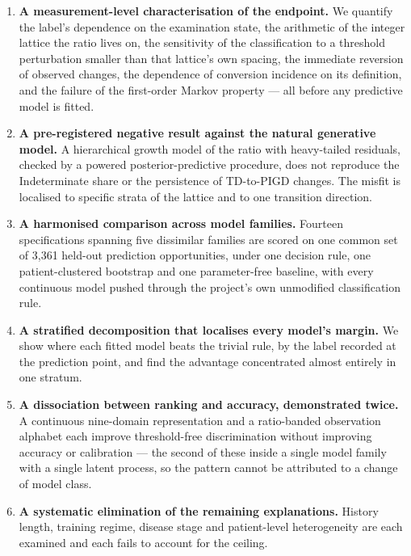 \documentclass[11pt]{article}
\begin{document}
\begin{enumerate}
\itemsep2pt
\item \textbf{A measurement-level characterisation of the endpoint.} We quantify
the label's dependence on the examination state, the arithmetic of the integer
lattice the ratio lives on, the sensitivity of the classification to a threshold
perturbation smaller than that lattice's own spacing, the immediate reversion of
observed changes, the dependence of conversion incidence on its definition, and
the failure of the first-order Markov property --- all before any predictive
model is fitted.

\item \textbf{A pre-registered negative result against the natural generative
model.} A hierarchical growth model of the ratio with heavy-tailed residuals,
checked by a powered posterior-predictive procedure, does not reproduce the
Indeterminate share or the persistence of TD-to-PIGD changes. The misfit is
localised to specific strata of the lattice and to one transition direction.

\item \textbf{A harmonised comparison across model families.} Fourteen
specifications spanning five dissimilar families are scored on one common set of
3,361 held-out prediction opportunities, under one decision rule, one
patient-clustered bootstrap and one parameter-free baseline, with every
continuous model pushed through the project's own unmodified classification rule.

\item \textbf{A stratified decomposition that localises every model's margin.}
We show where each fitted model beats the trivial rule, by the label recorded at
the prediction point, and find the advantage concentrated almost entirely in one
stratum.

\item \textbf{A dissociation between ranking and accuracy, demonstrated twice.}
A continuous nine-domain representation and a ratio-banded observation alphabet
each improve threshold-free discrimination without improving accuracy or
calibration --- the second of these inside a single model family with a single
latent process, so the pattern cannot be attributed to a change of model class.

\item \textbf{A systematic elimination of the remaining explanations.} History
length, training regime, disease stage and patient-level heterogeneity are each
examined and each fails to account for the ceiling.
\end{enumerate}
\end{document}
